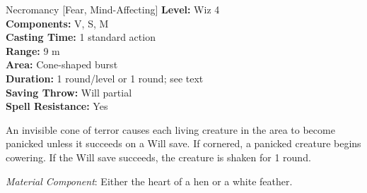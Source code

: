 {Necromancy [Fear, Mind-Affecting]}
{
	\textbf{Level:}
	Wiz 4\\
	\textbf{Components:}
	V, S, M\\
	\textbf{Casting Time:}
	1 standard action\\
	\textbf{Range:}
	9 m\\
	\textbf{Area:}
	Cone-shaped burst\\
	\textbf{Duration:}
	1 round/level or 1 round; see text\\
	\textbf{Saving Throw:}
	Will partial\\
	\textbf{Spell Resistance:}
	Yes\\
}
{
	An invisible cone of terror causes each living creature in the area to become panicked unless it succeeds on a Will save. If cornered, a panicked creature begins cowering. If the Will save succeeds, the creature is shaken for 1 round.

	\textit{Material Component}:
	Either the heart of a hen or a white feather.

}
